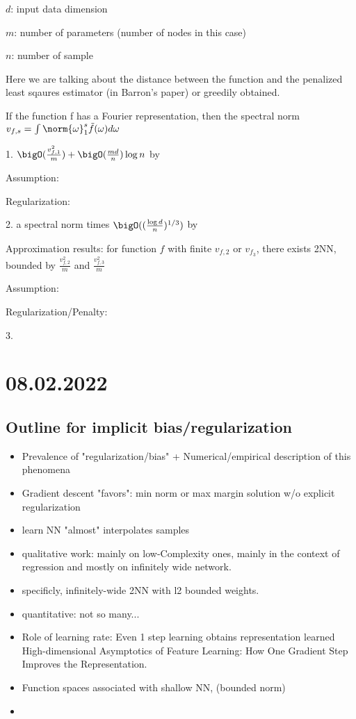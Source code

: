 \newpage
$d$: input data dimension

$m$: number of parameters (number of nodes in this case)

$n$: number of sample

Here we are talking about the distance between the function and the 
penalized least sqaures estimator (in Barron's paper) or greedily obtained.


If the function f has a Fourier representation, then the spectral norm
$v_{f, s} = \int \norm{\omega}_1^s \tilde{f}(\omega) d\omega$

1. $\bigO(\frac{v_{f,1}^2}{m}) + \bigO(\frac{md}{n})\log{n}$ by \cite[Theorem 3/4]{barronApproximationEstimationBounds1994}

Assumption: 

Regularization:

2. a spectral norm times $\bigO((\frac{\log{d}}{n})^{1/3})$ by \cite[Theorem 1]{klusowskiRiskBoundsHighdimensional2018}

Approximation results: for function $f$ with finite $v_{f,2}$ or $v_{f_3}$, there exists 2NN, bounded by $\frac{v_{f,2}^2}{m}$ and $\frac{v_{f,3}^2}{m}$ 

Assumption: 

Regularization/Penalty:

3. 


\newpage

\section{08.02.2022}

\subsection{Outline for implicit bias/regularization}

\begin{itemize}
    \item Prevalence of "regularization/bias" + Numerical/empirical description
    of this phenomena
    \item Gradient descent "favors": min norm or max margin solution w/o
    explicit regularization
    \item learn NN "almost" interpolates samples
    \item qualitative work: mainly on low-Complexity ones, mainly in the context
    of regression and mostly on infinitely wide network.
    \item specificly, infinitely-wide 2NN with l2 bounded weights.
    \item quantitative: not so many...
    \item Role of learning rate: Even 1 step learning obtains representation
    learned \\ High-dimensional Asymptotics of Feature Learning: How One Gradient
    Step Improves the Representation.
    \item Function spaces associated with shallow NN, (bounded norm)
    \item 
\end{itemize}

